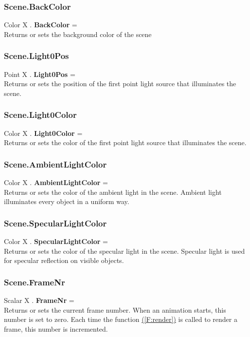\documentclass[10pt]{book}
\newcommand{\linkitem}[1]{\hyperref[#1]{\nameref{#1} (\ref{#1})}}
\begin{document}
\subsubsection{Scene.BackColor \label{F:Scene:BackColor}}
Color X . \textbf{BackColor} = \\
Returns or sets the background color of the scene

\subsubsection{Scene.Light0Pos \label{F:Scene:Light0Pos}}
Point X . \textbf{Light0Pos} = \\
Returns or sets the position of the first point light source that illuminates the scene.

\subsubsection{Scene.Light0Color \label{F:Scene:Light0Color}}
Color X . \textbf{Light0Color} = \\
Returns or sets the color of the first point light source that illuminates the scene.

\subsubsection{Scene.AmbientLightColor \label{F:Scene:AmbientLightColor}}
Color X . \textbf{AmbientLightColor} = \\
Returns or sets the color of the ambient light in the scene. Ambient light illuminates every object in a uniform way.

\subsubsection{Scene.SpecularLightColor \label{F:Scene:SpecularLightColor}}
Color X . \textbf{SpecularLightColor} = \\
Returns or sets the color of the specular light in the scene. Specular light is used for specular reflection on visible objects.

\subsubsection{Scene.FrameNr \label{F:Scene:FrameNr}}
Scalar X . \textbf{FrameNr} = \\
Returns or sets the current frame number. When an animation starts, this number is set to zero. Each time the function \linkitem{F:render} is called to render a frame, this number is incremented.
\end{document}
